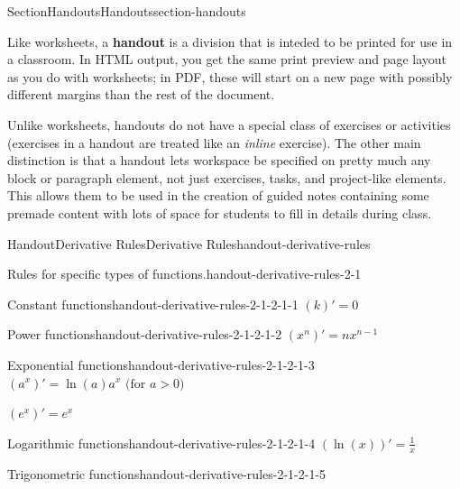 \documentclass[oneside,10pt,]{article}
\newcommand{\ptxterminology}[1]{\textbf{#1}}
\numberwithin{equation}{section}
\begin{document}
\begin{sectionptx}{Section}{Handouts}{}{Handouts}{}{}{section-handouts}
\begin{introduction}{}%
Like worksheets, a \ptxterminology{handout} is a division that is inteded to be printed for use in a classroom. In HTML output, you get the same print preview and page layout as you do with worksheets; in PDF, these will start on a new page with possibly different margins than the rest of the document.%
\par
Unlike worksheets, handouts do not have a special class of exercises or activities (exercises in a handout are treated like an \emph{inline} exercise). The other main distinction is that a handout lets workspace be specified on pretty much any block or paragraph element, not just exercises, tasks, and project-like elements.  This allows them to be used in the creation of guided notes containing some premade content with lots of space for students to fill in details during class.%
\end{introduction}%
%
%
\typeout{************************************************}
\typeout{************************************************}
%
\begin{handout-subsection}{Handout}{Derivative Rules}{}{Derivative Rules}{}{}{handout-derivative-rules}
\begin{paragraphs}{Rules for specific types of functions.}{handout-derivative-rules-2-1}%
%
\begin{descriptionlist}
\begin{dlimedium}{Constant functions}{handout-derivative-rules-2-1-2-1-1}%
\(\displaystyle (k)' = 0\)%
\end{dlimedium}%
\begin{dlimedium}{Power functions}{handout-derivative-rules-2-1-2-1-2}%
\(\displaystyle (x^{n})' = nx^{n-1}\)%
\end{dlimedium}%
\begin{dlimedium}{Exponential functions}{handout-derivative-rules-2-1-2-1-3}%
\((a^{x})' = \ln(a) a^{x} \text{ (for } a>0\text{)}\)%
\par
\((e^{x})' = e^{x}\)%
\end{dlimedium}%
\begin{dlimedium}{Logarithmic functions}{handout-derivative-rules-2-1-2-1-4}%
\(\displaystyle (\ln(x))' = \frac{1}{x}\)%
\end{dlimedium}%
\begin{dlimedium}{Trigonometric functions}{handout-derivative-rules-2-1-2-1-5}%

\end{dlimedium}
\end{descriptionlist}
\end{paragraphs}
\end{handout-subsection}
\end{sectionptx}
\end{document}
